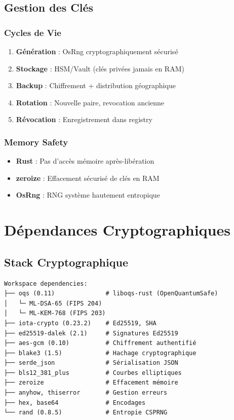 \documentclass[12pt,a4paper]{report}
\begin{document}
\section{Gestion des Clés}

\subsection{Cycles de Vie}

\begin{enumerate}
  \item \textbf{Génération} : OsRng cryptographiquement sécurisé
  \item \textbf{Stockage} : HSM/Vault (clés privées jamais en RAM)
  \item \textbf{Backup} : Chiffrement + distribution géographique
  \item \textbf{Rotation} : Nouvelle paire, revocation ancienne
  \item \textbf{Révocation} : Enregistrement dans registry
\end{enumerate}

\subsection{Memory Safety}

\begin{itemize}
  \item \textbf{Rust} : Pas d'accès mémoire après-libération
  \item \textbf{zeroize} : Effacement sécurisé de clés en RAM
  \item \textbf{OsRng} : RNG système hautement entropique
\end{itemize}

\chapter{Dépendances Cryptographiques}

\section{Stack Cryptographique}

\begin{lstlisting}
Workspace dependencies:
├── oqs (0.11)              # liboqs-rust (OpenQuantumSafe)
│   └─ ML-DSA-65 (FIPS 204)
│   └─ ML-KEM-768 (FIPS 203)
├── iota-crypto (0.23.2)    # Ed25519, SHA
├── ed25519-dalek (2.1)     # Signatures Ed25519
├── aes-gcm (0.10)          # Chiffrement authentifié
├── blake3 (1.5)            # Hachage cryptographique
├── serde_json              # Sérialisation JSON
├── bls12_381_plus          # Courbes elliptiques
├── zeroize                 # Effacement mémoire
├── anyhow, thiserror       # Gestion erreurs
├── hex, base64             # Encodages
└── rand (0.8.5)            # Entropie CSPRNG
\end{lstlisting}
\end{document}
